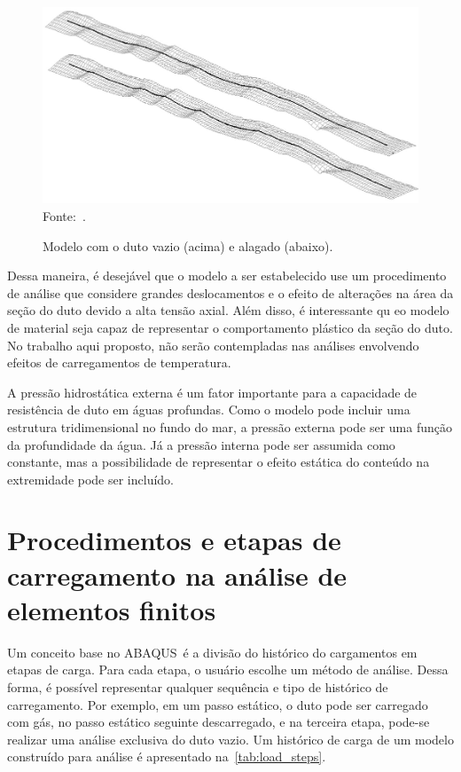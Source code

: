 \begin{figure}[th!]
    \centering
    \caption{Modelo com o duto vazio (acima) e alagado (abaixo).}\label{fig:duto_alagado}
    \includegraphics[width=0.7\linewidth]{imagens/duto_alagado}
    \\Fonte:~.
\end{figure}

Dessa maneira, é desejável que o modelo a ser estabelecido use um procedimento de análise que considere grandes deslocamentos e o efeito de alterações na área da seção do duto devido a alta tensão axial.
Além disso, é interessante qu eo modelo de material seja capaz de representar o comportamento plástico da seção do duto. No trabalho aqui proposto, não serão contempladas nas análises envolvendo efeitos de carregamentos de temperatura.

A pressão hidrostática externa é um fator importante para a capacidade de resistência de duto em águas profundas.
Como o modelo pode incluir uma estrutura tridimensional no fundo do mar, a pressão externa pode ser uma função da profundidade da água.
Já a pressão interna pode ser assumida como constante, mas a possibilidade de representar o efeito estática do conteúdo na extremidade pode ser incluído.


\section{Procedimentos e etapas de carregamento na análise de elementos finitos}


Um conceito base no ABAQUS~é a divisão do histórico do cargamentos em etapas de carga. Para cada etapa, o usuário escolhe um método de análise.
Dessa forma, é possível representar qualquer sequência  e tipo de histórico de carregamento.
Por exemplo, em um passo estático, o duto pode ser carregado com gás, no passo estático seguinte descarregado, e na terceira etapa, pode-se realizar uma análise exclusiva do duto vazio.
Um histórico de carga de um modelo construído para análise é apresentado na~\autoref{tab:load_steps}.


